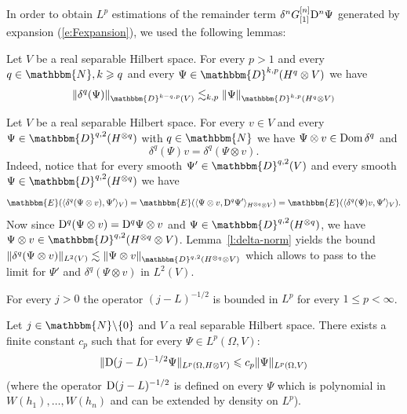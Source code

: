 \begin{appendices}
In order to obtain $L^p$ estimations of the remainder term $\delta^n
G_{[1]}^{[n]} \mathrm{D}^n \Psi$ generated by expansion (\ref{e:Fexpansion}), we
used the following lemmas:

\begin{lemma}
  \label{l:delta-norm}Let $V$ be a real separable Hilbert space. For every $p
  > 1$ and every $q \in \mathbbm{N}, k \geqslant q$ and every $\Psi \in
  \mathbbm{D}^{k, p} (H^q \otimes V)$ we have
  \[ \| \delta^q (\Psi) \|_{\mathbbm{D}^{k - q, p} (V)} \lesssim_{k, p} \|
     \Psi \|_{\mathbbm{D}^{k, p} (H^q \otimes V)} \]
\end{lemma}

\begin{remark}
  \label{r:delta-deterministic}Let $V$ be a real separable Hilbert space. For
  every $v \in V$ and every $\Psi \in \mathbbm{D}^{q, 2} (H^{\otimes q})$ with
  $q \in \mathbbm{N}$ we have $\Psi \otimes v \in \operatorname{Dom} \delta^q$ and
  \[ \delta^q (\Psi) v = \delta^q (\Psi \otimes v) . \]
  Indeed, notice that for every smooth $\Psi' \in \mathbbm{D}^{q, 2} (V)$ and
  every smooth $\Psi \in \mathbbm{D}^{q, 2} (H^{\otimes q})$ we have
  \[ \mathbbm{E} (\langle \delta^q (\Psi \otimes v), \Psi' \rangle_V)
     =\mathbbm{E} (\langle \Psi \otimes v, \mathD^q \Psi' \rangle_{H^{\otimes
     q} \otimes V}) =\mathbbm{E} (\langle \delta^q (\Psi) v, \Psi' \rangle_V)
     . \]
  Now since $\mathrm{D}^q (\Psi \otimes v) = \mathrm{D}^q \Psi \otimes v$ and $\Psi
  \in \mathbbm{D}^{q, 2} (H^{\otimes q})$, we have $\Psi \otimes v \in
  \mathbbm{D}^{q, 2} (H^{\otimes q} \otimes V)$. Lemma~\ref{l:delta-norm}
  yields the bound $\| \delta^q (\Psi \otimes v) \|_{L^2 (V)} \lesssim \| \Psi
  \otimes v \|_{\mathbbm{D}^{q, 2} (H^{\otimes q} \otimes V)}$ which allows to
  pass to the limit for $\Psi'$ and $\delta^q (\Psi \otimes v)$ in $L^2 (V)$.
\end{remark}

\begin{lemma}
  For every $j > 0$ the operator $(j - L)^{- 1 / 2}$ is bounded in $L^p$ for
  every $1 \leqslant p < \infty$. 
\end{lemma}

\begin{lemma}
  \label{l:bounded-oper}Let $j \in \mathbbm{N}\backslash \{ 0 \}$ and $V$ a
  real separable Hilbert space. There exists a finite constant $c_p$ such that
  for every $\Psi \in L^p (\Omega, V)$:
  \[ \| \mathrm{D} (j - L)^{- 1 / 2} \Psi \|_{L^p (\Omega, H \otimes V)} \leqslant
     c_p \| \Psi \|_{L^p (\Omega, V)} \]
  (where the operator $\mathrm{D} (j - L)^{- 1 / 2}$ is defined on every $\Psi$
  which is polynomial in $W (h_1), \ldots, W (h_n)$ and can be extended by
  density on $L^p$).
\end{lemma}


\end{appendices}
